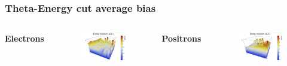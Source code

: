 \documentclass{beamer}
\begin{document}
		\begin{frame}
			\frametitle{Theta-Energy cut average bias}
			\begin{columns}
				\centering
				\Large \textbf{Electrons}
				\begin{figure}
					\centering
					\includegraphics[width = 0.95 \linewidth]{../images/c_e_theta_energy.png}
				\end{figure}
				\centering
				\Large \textbf{Positrons}
				\begin{figure}
					\centering
					\includegraphics[width = 0.95 \linewidth]{../images/c_p_theta_energy.png}
				\end{figure}
			\end{columns}
		\end{frame}
\end{document}
